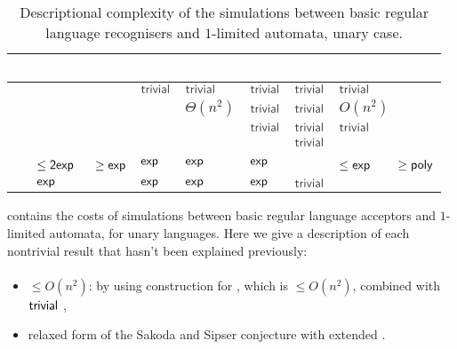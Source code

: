 \begin{table}
	\centering
	\renewcommand{\arraystretch}{1.2}
	\renewcommand{\hstdef}{1.75}
	\begin{tabular}{|l|p{4.2em}|l|p{4.3em}|l|l|p{4.3em}|}
		\hline
		~     & \ODFA                            & \ONFA           & \TDFA                                            & \TNFA     & \OLA      & \ODLA                                            \\ \hline
		\ODFA & \cY                              & $\Cctriv$       & $\Cctriv$                                        & $\Cctriv$ & $\Cctriv$ & $\Cctriv$                                        \\ \hline
		\ONFA & \rbt{$\CsubEq$}                  & \cY             & \cR $\Theta(n^2)$                                & $\Cctriv$ & $\Cctriv$ & \cB $O(n^2)$                                     \\ \hline
		\TDFA & \rbt{$\CsubEq$}                  & \rbt{$\CsubEq$} & \cY                                              & $\Cctriv$ & $\Cctriv$ & $\Cctriv$                                        \\ \hline
		\TNFA & \rbt{$\CsubEq$}                  & \rbt{$\CsubEq$} & \cR \rbt[.3]{$\le\Csubln$} \rbt[.2]{$\ge\Cpoly$} & \cY       & $\Cctriv$ & \cB \rbt[.3]{$\le\Csubln$} \rbt[.2]{$\ge\Cpoly$} \\ \hline
		\OLA  & $\le\Cdexp\hst[1.15]$ $\ge\Cexp$ & $\Cexp$         & \cG $\Cexp$                                      & $\Cexp$   & \cY       & \cG $\le\Cexp\hst$ $\ge\Cpoly$                   \\ \hline
		\ODLA & $\Cexp$                          & $\Cexp$         & $\Cexp$                                          & $\Cexp$   & $\Cctriv$ & \cY                                              \\ \hline
	\end{tabular}
	\caption{Descriptional complexity of the simulations between basic regular language recognisers and $1$-limited automata, unary case.}
	\label{tab:sims-1la-unary}
\end{table}

 contains the costs of simulations between basic regular language acceptors and $1$-limited automata, for unary languages.
Here we give a description of each nontrivial result that hasn't been explained previously:

\paragraph{\ONFA{}\tto\ODLA}\label{cost:1NFAto1DLAu}
\begin{itemize}
	\item $\le O(n^2)$: by using construction for \hyperref[cost:1NFAto2DFAu]{\ONFA{}\tto\TDFA}, which is $\le O(n^2)$, combined with $\Ctriv$ \TDFA{}\tto\ODLA,
	\item relaxed form of the Sakoda and Sipser conjecture with extended \TDFA.
\end{itemize}
